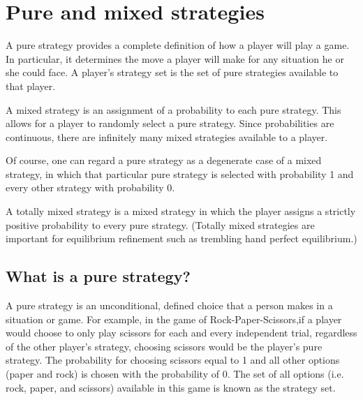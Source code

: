 \documentclass[a4paper,12pt]{article}
\begin{document}
\section{Pure and mixed strategies}
A pure strategy provides a complete definition of how a player will play a game. In particular, it determines the move a player will make for any situation he or she could face. A player's strategy set is the set of pure strategies available to that player.

A mixed strategy is an assignment of a probability to each pure strategy. This allows for a player to randomly select a pure strategy. Since probabilities are continuous, there are infinitely many mixed strategies available to a player.

Of course, one can regard a pure strategy as a degenerate case of a mixed strategy, in which that particular pure strategy is selected with probability 1 and every other strategy with probability 0.

A totally mixed strategy is a mixed strategy in which the player assigns a strictly positive probability to every pure strategy. (Totally mixed strategies are important for equilibrium refinement such as trembling hand perfect equilibrium.)



\subsection{What is a pure strategy?}

A pure strategy is an unconditional, defined choice that a person makes in a situation or game. For example, in the game of Rock-Paper-Scissors,if a player would choose to only play scissors for each and every independent trial, regardless of the other player’s strategy, choosing scissors would be the player’s pure strategy. The probability for choosing scissors equal to 1 and all other options (paper and rock) is chosen with the probability of 0. The set of all options (i.e. rock, paper, and scissors) available in this game is known as the strategy set.

\end{document}
